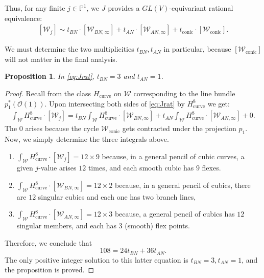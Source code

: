\documentclass[12 pt, reqno]{amsart}
\newtheorem{prop}[thm]{Proposition}
\theoremstyle{definition}
\newcommand{\on}{\operatorname}
\newcommand{\mb}{\mathbb}
\renewcommand{\P}{\mb{P}}
\begin{document}
Thus, for any finite $j \in \P^{1}$, we $J$ provides a
$GL(V)$-equivariant rational equivalence:
\begin{align}
  \label{eq:Jrat}
  [\mathcal{W}_{j}] \sim t_{BN} \cdot [\mathcal{W}_{BN, \infty}] + t_{AN} \cdot [\mathcal{W}_{AN, \infty}] + t_{\on{conic}} \cdot [\mathcal{W}_{\on{conic}}]. 
\end{align}

We must determine the two multiplicities $t_{BN},t_{AN}$ in
particular, because $[\mathcal{W}_{\on{conic}}]$ will not matter in
the final analysis.

\begin{prop}
  \label{prop:tBNtAN}
  In \eqref{eq:Jrat}, $t_{BN} = 3$ and $t_{AN} = 1$.
\end{prop}

\begin{proof}
  Recall from  the class $H_{\on{curve}}$ on $\mathcal{W}$
  corresponding to the line bundle $p_{1}^{*}(\mathcal{O}(1))$.  Upon
  intersecting both sides of \eqref{eq:Jrat} by $H_{\on{curve}}^{8}$
  we get:
  \begin{align}
    \label{eq:intW}
    \int_{\mathcal{W}} H_{\on{curve}}^{8} \cdot  [\mathcal{W}_{j}]  = t_{BN} \int_{\mathcal{W}}H_{\on{curve}}^{8} \cdot   [\mathcal{W}_{BN, \infty}] + t_{AN} \int_{\mathcal{W}}H_{\on{curve}}^{8} \cdot  [\mathcal{W}_{AN, \infty}] + 0.  
  \end{align}
  The $0$ arises because the cycle $\mathcal{W}_{\on{conic}}$ gets
  contracted under the projection $p_{1}$.  Now, we simply determine
  the three integrals above.
  \begin{enumerate}
  \item
    $\int_{\mathcal{W}} H_{\on{curve}}^{8} \cdot [\mathcal{W}_{j}] =
    12 \times 9$ because, in a general pencil of cubic curves, a given
    $j$-value arises $12$ times, and each smooth cubic has $9$ flexes.

  \item
    $\int_{\mathcal{W}}H_{\on{curve}}^{8} \cdot [\mathcal{W}_{BN,
      \infty}] = 12 \times 2$ because, in a general pencil of cubics,
    there are $12$ singular cubics and each one has two branch lines,

  \item
    $\int_{\mathcal{W}}H_{\on{curve}}^{8} \cdot [\mathcal{W}_{AN,
      \infty}] = 12 \times 3$ because, a general pencil of cubics has
    $12$ singular members, and each has $3$ (smooth) flex points.
  \end{enumerate}

  Therefore, we conclude that \[108 = 24t_{BN} + 36t_{AN}.\] The only
  positive integer solution to this latter equation is
  $t_{BN} = 3, t_{AN} = 1$, and the proposition is proved.
\end{proof}
\end{document}
